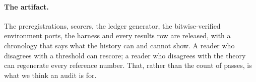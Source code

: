 \paragraph{The artifact.} The preregistrations, scorers, the ledger
generator, the bitwise-verified environment ports, the harness and every
results row are released, with a chronology that says what the history can
and cannot show. A reader who disagrees with a threshold can rescore; a reader
who disagrees with the theory can regenerate every reference number. That,
rather than the count of passes, is what we think an audit is for.
